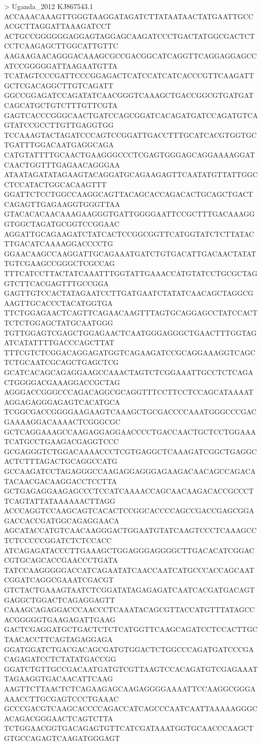 > Uganda_2012 KJ867543.1
ACCAAACAAAGTTGGGTAAGGATAGATCTTATAATAACTATGAATTGCCACGCTTAGGATTAAAGATCCT
ACTGCCGGGGGGAGGAGTAGGAGCAAGATCCCTGACTATGGCGACTCTCCTCAAGAGCTTGGCATTGTTC
AAGAAGAACAGGGACAAAGCGCCGACGGCATCAGGTTCAGGAGGAGCCATCCGGGGGATTAAGAATGTTA
TCATAGTCCCGATTCCCGGAGACTCATCCATCATCACCCGTTCAAGATTGCTCGACAGGCTTGTCAGATT
GGCCGGAGATCCAGATATCAACGGGTCAAAGCTGACCGGCGTGATGATCAGCATGCTGTCTTTGTTCGTA
GAGTCACCCGGGCAACTGATCCAGCGGATCACAGATGATCCAGATGTCAGTATCCGCCTTGTTGAGGTGG
TCCAAAGTACTAGATCCCAGTCCGGATTGACCTTTGCATCACGTGGTGCTGATTTGGACAATGAGGCAGA
CATGTATTTTGCAACTGAAGGGCCCTCGAGTGGGAGCAGGAAAAGGATCAACTGGTTTGAGAACAGGGAA
ATAATAGATATAGAAGTACAGGATGCAGAAGAGTTCAATATGTTATTGGCCTCCATACTGGCACAAGTTT
GGATTCTCCTGGCCAAGGCAGTTACAGCACCAGACACTGCAGCTGACTCAGAGTTGAGAAGGTGGGTTAA
GTACACACAACAAAGAAGGGTGATTGGGGAATTCCGCTTTGACAAAGGGTGGCTAGATGCGGTCCGGAAC
AGGATTGCAGAAGATCTATCACTCCGGCGGTTCATGGTATCTCTTATACTTGACATCAAAAGGACCCCTG
GGAACAAGCCAAGGATTGCAGAAATGATCTGTGACATTGACAACTATATTGTCGAAGCCGGGCTCGCCAG
TTTCATCCTTACTATCAAATTTGGTATTGAAACCATGTATCCTGCGCTAGGTCTTCACGAGTTTGCCGGA
GAGTTGTCCACTATAGAATCCTTGATGAATCTATATCAACAGCTAGGCGAAGTTGCACCCTACATGGTGA
TTCTGGAGAACTCAGTTCAGAACAAGTTTAGTGCAGGAGCCTATCCACTTCTCTGGAGCTATGCAATGGG
TGTTGGAGTCGAGCTGGAGAACTCAATGGGAGGGCTGAACTTTGGTAGATCATATTTTGACCCAGCTTAT
TTTCGTCTCGGACAGGAGATGGTCAGAAGATCCGCAGGAAAGGTCAGCTCTGCAATCGCAGCTGAGCTCG
GCATCACAGCAGAGGAAGCCAAACTAGTCTCGGAAATTGCCTCTCAGACTGGGGACGAAAGGACCGCTAG
AGGGACCGGGCCCAGACAGGCGCAGGTTTCCTTCCTCCAGCATAAAATAGGAGAGGGAGAGTCACATGCA
TCGGCGACCGGGGAAGAAGTCAAAGCTGCGACCCCAAATGGGCCCGACGAAAAGGACAAAACTCGGGCGC
GCTCAGGAAAGCCAAGAGGAGGAACCCCTGACCAACTGCTCCTGGAAATCATGCCTGAAGACGAGGTCCC
GCGAGGGTCTGGACAAAACCCTCGTGAGGCTCAAAGATCGGCTGAGGCACTCTTTAGACTGCAGGCCATG
GCCAAGATCCTAGAGGGCCAAGAGGAGGGAGAAGACAACAGCCAGACATACAACGACAAGGACCTCCTTA
GCTGAGAGGAAGAGCCCTCCATCAAAACCAGCAACAAGACACCGCCCTTCAGTATTATAAAAAACTTAGG
ACCCAGGTCCAAGCAGTCACACTCCGGCACCCCAGCCGACCGAGCGGAGACCACCGATGGCAGAGGAACA
AGCATACCATGTCAACAAGGGACTGGAATGTATCAAGTCCCTCAAAGCCTCTCCCCCGGATCTCTCCACC
ATCAGAGATACCCTTGAAAGCTGGAGGGAGGGGCTTGACACATCGGACCGTGCAGCACCGAACCCTGATA
TATCCAAGGGGGACCATCAGAATATCAACCAATCATGCCCACCAGCAATCGGATCAGGCGAAATCGACGT
GTCTACTGAAAGTAATCTCGGATATAGAGAGATCAATCACGATGACAGTGAGGCTGGACTCAGAGGAGTT
CAAAGCAGAGGACCCAACCCTCAAATACAGCGTTACCATGTTTATAGCCACGGGGGTGAAGAGATTGAAG
GACTCGAGGATGCTGACTCTCTCATGGTTCAAGCAGATCCTCCACTTGCTAACACCTTCAGTAGAGGAGA
GGATGGATCTGACGACAGCGATGTGGACTCTGGCCCAGATGATCCCGACAGAGATCCTCTATATGACCGG
GGATCTGTTGCCGACAATGATGTCGTTAAGTCCACAGATGTCGAGAAATTAGAAGGTGACAACATTCAAG
AAGTTCTTAACTCTCAGAAGAGCAAGAGGGGAAAATTCCAAGGCGGGAAAACCTTGCGAGTCCCTGAAAC
GCCCGACGTCAAGCACCCCAGACCATCAGCCCAATCAATTAAAAAGGGCACAGACGGGAACTCAGTCTTA
TCTGGAACGGTGACAGAGTGTTCATCGATAAATGGTGCAACCCAAGCTGTGCCAGAGTCAAGATGGGAGT
